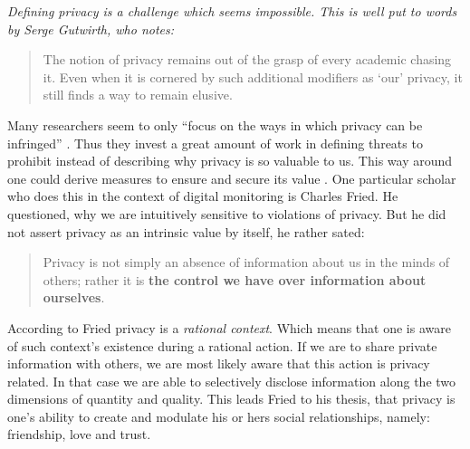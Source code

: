 \documentclass[runningheads,a4paper]{llncs}
\newenvironment{LGContent}
{ \par\color{blue} \it \small }
{ \par }
\begin{document}
\begin{LGContent}
Defining privacy is a challenge which seems impossible. This is well put to words by Serge Gutwirth, who notes:

\begin{quote}
The notion of privacy remains out of the grasp of every academic chasing it. Even when it is cornered by such additional modifiers as `our' privacy, it still finds a way to remain elusive. \cite{Gutwirth}
\end{quote}


Many researchers seem to only ``focus on the ways in which privacy can be infringed'' \cite{7ToP}.
Thus they invest a great amount of work in defining threats to prohibit instead of describing why privacy is so valuable to us.
This way around one could derive measures to ensure and secure its value \cite{7ToP}.
One particular scholar who does this in the context of digital monitoring is Charles Fried.
He questioned, why we are intuitively sensitive to violations of privacy.
But he did not assert privacy as an intrinsic value by itself, he rather sated:

\begin{quote}
Privacy is not simply an absence of information about us in the minds of others;
rather it is \textbf{the control we have over information about ourselves}. \cite{CFried:Privacy}
\end{quote}

According to Fried privacy is a \textit{rational context}.
Which means that one is aware of such context's existence during a rational action.
If we are to share private information with others, we are most likely aware that this action is privacy related.
In that case we are able to selectively disclose information along the two dimensions of quantity and quality.
This leads Fried to his thesis, that privacy is one's ability to create and modulate his or hers social relationships, namely: friendship, love and trust. \cite{CFried:Privacy}


\end{LGContent}
\end{document}
